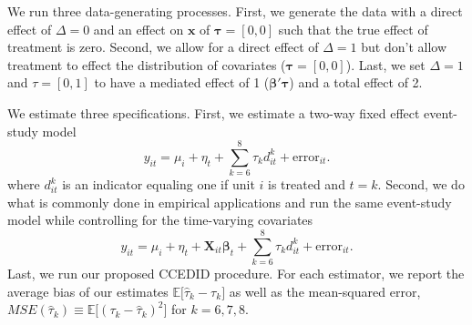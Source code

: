 \documentclass[12pt,fleqn]{article}
\def\*#1{\mathbf{#1}}
\def\+#1{\boldsymbol{#1}}
\begin{document}
We run three data-generating processes. First, we generate the data with a direct effect of $\Delta = 0$ and an effect on $\*x$ of $\+\tau = [0, 0]$ such that the true effect of treatment is zero. Second, we allow for a direct effect of $\Delta = 1$ but don't allow treatment to effect the distribution of covariates ($\+\tau = [0, 0]$). Last, we set $\Delta = 1$ and $\tau = [0, 1]$ to have a mediated effect of 1 ($\+\beta' \+\tau$) and a total effect of 2.

We estimate three specifications. First, we estimate a two-way fixed effect event-study model 
\begin{equation}\label{eq:monte_twfe} 
    y_{it} = \mu_i + \eta_t + \sum_{k=6}^8 \tau_{k} d_{it}^k + \text{error}_{it}.
\end{equation}
where $d_{it}^k$ is an indicator equaling one if unit $i$ is treated and $t = k$. Second, we do what is commonly done in empirical applications and run the same event-study model while controlling for the time-varying covariates 
\begin{equation}\label{eq:monte_twfe_cov} 
    y_{it} = \mu_i + \eta_t + \bm X_{it} \bm \beta_t + \sum_{k=6}^8 \tau_{k} d_{it}^k + \text{error}_{it}.
\end{equation}
Last, we run our proposed CCEDID procedure. For each estimator, we report the average bias of our estimates $\mathbb{E}\big[ \widehat{\tau}_k - \tau_k \big]$ as well as the mean-squared error, $MSE(\widehat{\tau}_k) \equiv \mathbb{E}\big[ (\tau_k - \widehat{\tau}_k)^2 \big]$ for $k = 6, 7, 8$.
\end{document}
